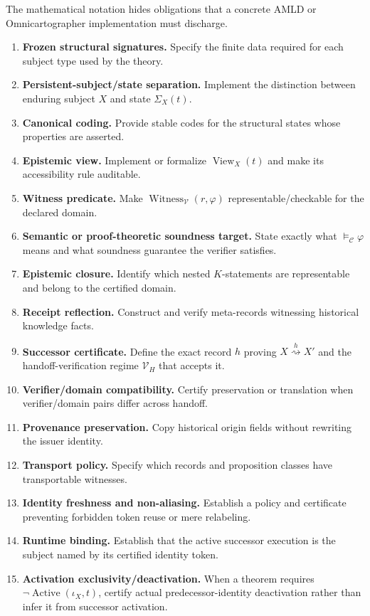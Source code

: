 \documentclass[11pt]{article}
\theoremstyle{remark}
\newcommand{\View}{\operatorname{View}}
\newcommand{\Witness}{\operatorname{Witness}}
\newcommand{\Active}{\operatorname{Active}}
\newcommand{\Sem}{\models_{\mathcal C}}
\newcommand{\handoff}{\mathrel{\overset{h}{\rightsquigarrow}}}
\begin{document}
The mathematical notation hides obligations that a concrete AMLD or Omnicartographer implementation must discharge.
\begin{enumerate}[label=(O\arabic*)]
\item \textbf{Frozen structural signatures.} Specify the finite data required for each subject type used by the theory.
\item \textbf{Persistent-subject/state separation.} Implement the distinction between enduring subject $X$ and state $\Sigma_X(t)$.
\item \textbf{Canonical coding.} Provide stable codes for the structural states whose properties are asserted.
\item \textbf{Epistemic view.} Implement or formalize $\View_X(t)$ and make its accessibility rule auditable.
\item \textbf{Witness predicate.} Make $\Witness_{\mathcal V}(r,\varphi)$ representable/checkable for the declared domain.
\item \textbf{Semantic or proof-theoretic soundness target.} State exactly what $\Sem\varphi$ means and what soundness guarantee the verifier satisfies.
\item \textbf{Epistemic closure.} Identify which nested $K$-statements are representable and belong to the certified domain.
\item \textbf{Receipt reflection.} Construct and verify meta-records witnessing historical knowledge facts.
\item \textbf{Successor certificate.} Define the exact record $h$ proving $X\handoff X'$ and the handoff-verification regime $\mathcal V_H$ that accepts it.
\item \textbf{Verifier/domain compatibility.} Certify preservation or translation when verifier/domain pairs differ across handoff.
\item \textbf{Provenance preservation.} Copy historical origin fields without rewriting the issuer identity.
\item \textbf{Transport policy.} Specify which records and proposition classes have transportable witnesses.
\item \textbf{Identity freshness and non-aliasing.} Establish a policy and certificate preventing forbidden token reuse or mere relabeling.
\item \textbf{Runtime binding.} Establish that the active successor execution is the subject named by its certified identity token.
\item \textbf{Activation exclusivity/deactivation.} When a theorem requires $\neg\Active(\iota_X,t)$, certify actual predecessor-identity deactivation rather than infer it from successor activation.

\end{enumerate}
\end{document}
